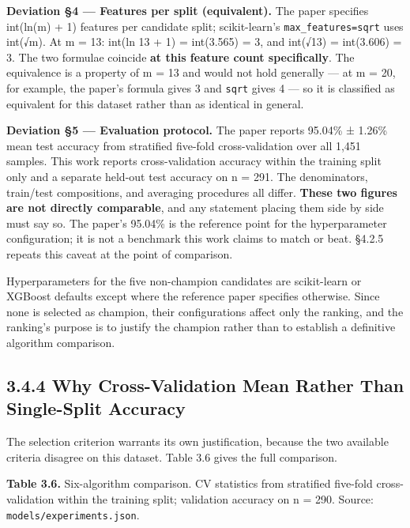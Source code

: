 \textbf{Deviation §4 --- Features per split (equivalent).} The paper specifies int(ln(m) + 1) features per candidate split; scikit-learn's \texttt{max\_features=\textquotesingle{}sqrt\textquotesingle{}} uses int(√m). At m = 13: int(ln 13 + 1) = int(3.565) = 3, and int(√13) = int(3.606) = 3. The two formulae coincide \textbf{at this feature count specifically}. The equivalence is a property of m = 13 and would not hold generally --- at m = 20, for example, the paper's formula gives 3 and \texttt{\textquotesingle{}sqrt\textquotesingle{}} gives 4 --- so it is classified as equivalent for this dataset rather than as identical in general.

\textbf{Deviation §5 --- Evaluation protocol.} The paper reports 95.04\% ± 1.26\% mean test accuracy from stratified five-fold cross-validation over all 1,451 samples. This work reports cross-validation accuracy within the training split only and a separate held-out test accuracy on n = 291. The denominators, train/test compositions, and averaging procedures all differ. \textbf{These two figures are not directly comparable}, and any statement placing them side by side must say so. The paper's 95.04\% is the reference point for the hyperparameter configuration; it is not a benchmark this work claims to match or beat. §4.2.5 repeats this caveat at the point of comparison.

Hyperparameters for the five non-champion candidates are scikit-learn or XGBoost defaults except where the reference paper specifies otherwise. Since none is selected as champion, their configurations affect only the ranking, and the ranking's purpose is to justify the champion rather than to establish a definitive algorithm comparison.

\hypertarget{why-cross-validation-mean-rather-than-single-split-accuracy}{%
\subsection{3.4.4 Why Cross-Validation Mean Rather Than Single-Split Accuracy}\label{why-cross-validation-mean-rather-than-single-split-accuracy}}

The selection criterion warrants its own justification, because the two available criteria disagree on this dataset. Table 3.6 gives the full comparison.

\textbf{Table 3.6.} Six-algorithm comparison. CV statistics from stratified five-fold cross-validation within the training split; validation accuracy on n = 290. Source: \texttt{models/experiments.json}.

